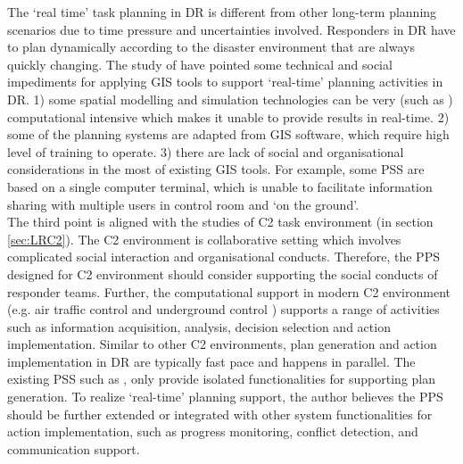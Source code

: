 The `real time' task planning in \ac{DR} is different from other long-term planning scenarios due to time pressure and uncertainties involved.  Responders in \ac{DR} have to plan dynamically according to the disaster environment that are always quickly changing. The study of \cite{Zerger2003} have pointed some technical and social impediments for applying \ac{GIS} tools to support `real-time' planning activities in \ac{DR}. 1) some spatial modelling and simulation technologies can be very (such as \cite{Eglese1994} ) computational intensive which makes it unable to provide results in real-time. 2) some of the planning systems are adapted from \ac{GIS} software, which require high level of training to operate. 3) there are lack of social and organisational considerations in the most of existing \ac{GIS} tools. For example, some \ac{PSS} are based on a single computer terminal, which is unable to facilitate information sharing with multiple users in control room and `on the ground'. \\

The third point is aligned with the studies of \ac{C2} task environment (in section \ref{sec:LRC2}). The \ac{C2} environment is collaborative setting which involves complicated social interaction and organisational conducts. Therefore, the PPS designed for \ac{C2} environment should consider supporting the social conducts of responder teams. Further, the computational support in modern \ac{C2} environment (e.g. air traffic control \cite{Mercer2014} and underground control \cite{Sharples2011}) supports a range of activities such as information acquisition, analysis, decision selection and action implementation. Similar to other \ac{C2} environments, plan generation and action implementation in DR are typically fast pace and happens in parallel. The existing \ac{PSS} such as \cite{IntergraphCorporation2000}, \cite{Eglese1994} only provide isolated functionalities for supporting plan generation. To realize `real-time' planning support, the author believes the PPS should be further extended or integrated with other system functionalities for action implementation, such as progress monitoring, conflict detection, and communication support.\\



